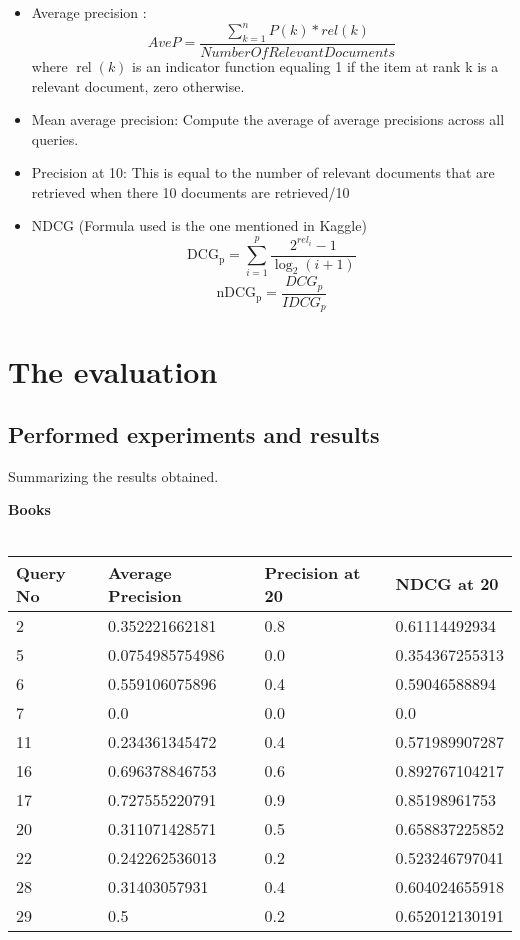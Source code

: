 \documentclass[12pt,letterpaper]{article}
\begin{document}
\begin{itemize}
\item Average precision \cite{ir}:
\begin{equation*}
AveP = \frac{\sum_{k=1}^{n} P(k)*rel(k)}{NumberOfRelevantDocuments}
\end{equation*}
where $\operatorname{rel}(k)$ is an indicator function equaling 1 if the item at rank k is a relevant document, zero otherwise.

\item Mean average precision: Compute the average of average precisions across all queries.

\item Precision at 10: This is equal to the number of relevant documents that are retrieved when there 10 documents are retrieved/10

\item NDCG (Formula used is the one mentioned in Kaggle) \cite{ndcg}
\begin{equation*}
\mathrm{DCG_{p}} = \sum_{i=1}^{p} \frac{ 2^{rel_{i}} - 1 }{ \log_{2}(i+1)} 
\end{equation*}
\begin{equation*}
    \mathrm{nDCG_{p}} = \frac{DCG_{p}}{IDCG_{p}} 
\end{equation*}
    
\end{itemize}

\section*{The evaluation}
\subsection*{Performed experiments and results}
Summarizing the results obtained.

\textbf{Books}
\\
\\
\begin{tabular}{| p{3.5cm} | p{3.5cm} | p{3.5cm} | p{3.5cm} |}
    \hline 
    Query No & Average Precision & Precision at 20 & NDCG at 20\\ \hline
    2 & 0.352221662181 & 0.8 & 0.61114492934\\
    5 & 0.0754985754986 & 0.0 & 0.354367255313\\
    6 & 0.559106075896 & 0.4 & 0.59046588894\\
    7 & 0.0 & 0.0 & 0.0\\
    11 & 0.234361345472 & 0.4 & 0.571989907287\\
    16 & 0.696378846753 & 0.6 & 0.892767104217\\
    17 & 0.727555220791 & 0.9 & 0.85198961753\\
    20 & 0.311071428571 & 0.5 & 0.658837225852\\
    22 & 0.242262536013 & 0.2 & 0.523246797041\\
    28 & 0.31403057931 & 0.4 & 0.604024655918\\
    29 & 0.5 & 0.2 & 0.652012130191\\
    
    \hline
\end{tabular} 
\end{document}
